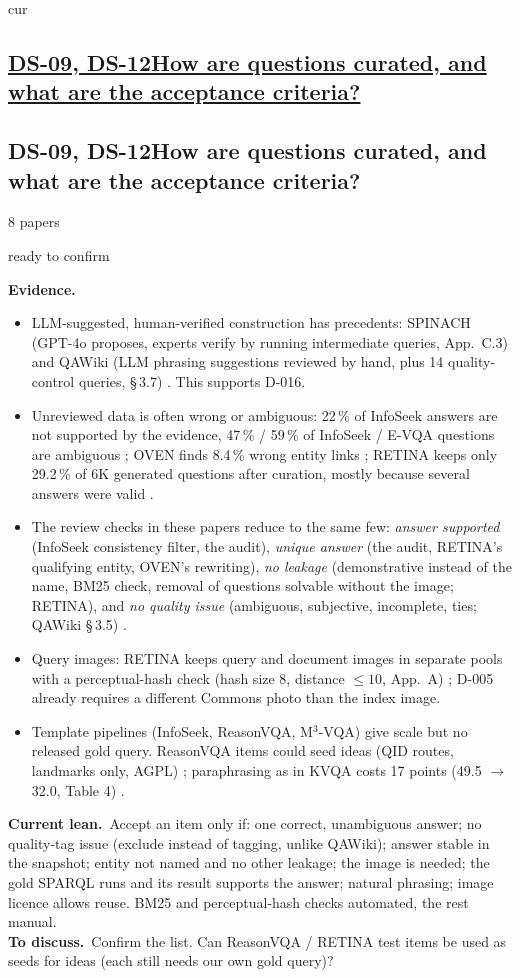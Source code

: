 \documentclass[10pt,a4paper]{article}
\newcommand{\st}[2]{\colorbox{#1}{\footnotesize\strut #2}}
\newcommand{\ready}{\st{green!20}{ready to confirm}}
\newcommand{\qblock}[1][]{\def\qkey{#1}\qblockx}
\newcommand{\qblockx}[4]{%
  \ifx\qkey\empty
  \subsection*{\underline{#1\quad #2}}%
  \else\hypertarget{\qkey}{}
  \subsection*{#1\quad #2}\fi%
{\footnotesize #3 papers\quad}#4\par}
\newcommand{\ev}{\textbf{Evidence.}}
\newcommand{\lean}{\textbf{Current lean.}}
\newcommand{\ask}{\textbf{To discuss.}}
\begin{document}
\qblock[cur]{DS-09, DS-12}{How are questions curated, and what are the
acceptance criteria?}{8}{\ready}
\ev
\begin{itemize}
  \item LLM-suggested, human-verified construction has precedents: SPINACH
    (GPT-4o proposes, experts verify by running intermediate queries,
    App.~C.3) \cite{liu2024spinach} and QAWiki (LLM phrasing suggestions
    reviewed by hand, plus 14 quality-control queries, \S\,3.7)
    \cite{loustaunau2025qawiki}. This supports D-016.
  \item Unreviewed data is often wrong or ambiguous: 22\,\% of InfoSeek
    answers are not supported by the evidence, 47\,\% / 59\,\% of InfoSeek /
    E-VQA questions are ambiguous \cite[\S\,3.1--3.2]{ma2026identifying};
    OVEN finds 8.4\,\% wrong entity links \cite[App.~10.2]{hu2023open}; RETINA
    keeps only 29.2\,\% of 6K generated questions after curation, mostly
    because several answers were valid \cite[App.~A.3]{lee2025breaking}.
  \item The review checks in these papers reduce to the same few:
    \emph{answer supported} (InfoSeek consistency filter, the audit),
    \emph{unique answer} (the audit, RETINA's qualifying entity, OVEN's
    rewriting), \emph{no leakage} (demonstrative instead of the name,
    BM25 check, removal of questions solvable without the image; RETINA),
    and \emph{no quality issue} (ambiguous, subjective, incomplete, ties;
    QAWiki \S\,3.5)
    \cite{chen2023can,ma2026identifying,lee2025breaking,hu2023open,loustaunau2025qawiki}.
  \item Query images: RETINA keeps query and document images in separate
    pools with a perceptual-hash check (hash size 8, distance $\le 10$,
    App.~A) \cite{lee2025breaking}; D-005 already requires a different
    Commons photo than the index image.
  \item Template pipelines (InfoSeek, ReasonVQA, M$^3$-VQA) give scale but
    no released gold query. ReasonVQA items could seed ideas (QID routes,
    landmarks only, AGPL) \cite{tran2025reasonvqa}; paraphrasing as in KVQA
    costs 17 points (49.5 $\to$ 32.0, Table 4) \cite{shah2019kvqa}.
\end{itemize}
\lean\ Accept an item only if: one correct, unambiguous answer; no
quality-tag issue (exclude instead of tagging, unlike QAWiki); answer stable
in the snapshot; entity not named and no other leakage; the image is needed;
the gold SPARQL runs and its result supports the answer; natural phrasing;
image licence allows reuse. BM25 and perceptual-hash checks automated, the
rest manual.\\
\ask\ Confirm the list. Can ReasonVQA / RETINA test items be used as
seeds for ideas (each still needs our own gold query)?
\end{document}

